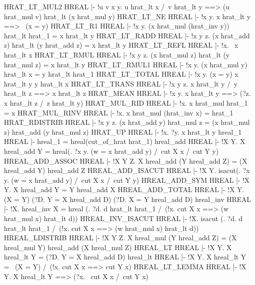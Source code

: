 \ENDTHEOREM
\THEOREM HRAT\_LT\_MUL2 HREAL
|- !u v x y.
    u hrat_lt x /\ v hrat_lt y ==> (u hrat_mul v) hrat_lt (x hrat_mul y)
\ENDTHEOREM
\THEOREM HRAT\_LT\_NE HREAL
|- !x y. x hrat_lt y ==> ~(x = y)
\ENDTHEOREM
\THEOREM HRAT\_LT\_R1 HREAL
|- !x y. (x hrat_mul (hrat_inv y)) hrat_lt hrat_1 = x hrat_lt y
\ENDTHEOREM
\THEOREM HRAT\_LT\_RADD HREAL
|- !x y z. (x hrat_add z) hrat_lt (y hrat_add z) = x hrat_lt y
\ENDTHEOREM
\THEOREM HRAT\_LT\_REFL HREAL
|- !x. ~x hrat_lt x
\ENDTHEOREM
\THEOREM HRAT\_LT\_RMUL HREAL
|- !x y z. (x hrat_mul z) hrat_lt (y hrat_mul z) = x hrat_lt y
\ENDTHEOREM
\THEOREM HRAT\_LT\_RMUL1 HREAL
|- !x y. (x hrat_mul y) hrat_lt x = y hrat_lt hrat_1
\ENDTHEOREM
\THEOREM HRAT\_LT\_TOTAL HREAL
|- !x y. (x = y) \/ x hrat_lt y \/ y hrat_lt x
\ENDTHEOREM
\THEOREM HRAT\_LT\_TRANS HREAL
|- !x y z. x hrat_lt y /\ y hrat_lt z ==> x hrat_lt z
\ENDTHEOREM
\THEOREM HRAT\_MEAN HREAL
|- !x y. x hrat_lt y ==> (?z. x hrat_lt z /\ z hrat_lt y)
\ENDTHEOREM
\THEOREM HRAT\_MUL\_RID HREAL
|- !x. x hrat_mul hrat_1 = x
\ENDTHEOREM
\THEOREM HRAT\_MUL\_RINV HREAL
|- !x. x hrat_mul (hrat_inv x) = hrat_1
\ENDTHEOREM
\THEOREM HRAT\_RDISTRIB HREAL
|- !x y z.
    (x hrat_add y) hrat_mul z = (x hrat_mul z) hrat_add (y hrat_mul z)
\ENDTHEOREM
\THEOREM HRAT\_UP HREAL
|- !x. ?y. x hrat_lt y
\ENDTHEOREM
\THEOREM hreal\_1 HREAL
|- hreal_1 = hreal(cut_of_hrat hrat_1)
\ENDTHEOREM
\THEOREM hreal\_add HREAL
|- !X Y.
    X hreal_add Y =
    hreal(\w. ?x y. (w = x hrat_add y) /\ cut X x /\ cut Y y)
\ENDTHEOREM
\THEOREM HREAL\_ADD\_ASSOC HREAL
|- !X Y Z. X hreal_add (Y hreal_add Z) = (X hreal_add Y) hreal_add Z
\ENDTHEOREM
\THEOREM HREAL\_ADD\_ISACUT HREAL
|- !X Y. isacut(\w. ?x y. (w = x hrat_add y) /\ cut X x /\ cut Y y)
\ENDTHEOREM
\THEOREM HREAL\_ADD\_SYM HREAL
|- !X Y. X hreal_add Y = Y hreal_add X
\ENDTHEOREM
\THEOREM HREAL\_ADD\_TOTAL HREAL
|- !X Y. (X = Y) \/ (?D. Y = X hreal_add D) \/ (?D. X = Y hreal_add D)
\ENDTHEOREM
\THEOREM hreal\_inv HREAL
|- !X.
    hreal_inv X =
    hreal
    (\w.
      ?d. d hrat_lt hrat_1 /\ (!x. cut X x ==> (w hrat_mul x) hrat_lt d))
\ENDTHEOREM
\THEOREM HREAL\_INV\_ISACUT HREAL
|- !X.
    isacut
    (\w.
      ?d. d hrat_lt hrat_1 /\ (!x. cut X x ==> (w hrat_mul x) hrat_lt d))
\ENDTHEOREM
\THEOREM HREAL\_LDISTRIB HREAL
|- !X Y Z.
    X hreal_mul (Y hreal_add Z) =
    (X hreal_mul Y) hreal_add (X hreal_mul Z)
\ENDTHEOREM
\THEOREM HREAL\_LT HREAL
|- !X Y. X hreal_lt Y = (?D. Y = X hreal_add D)
\ENDTHEOREM
\THEOREM hreal\_lt HREAL
|- !X Y. X hreal_lt Y = ~(X = Y) /\ (!x. cut X x ==> cut Y x)
\ENDTHEOREM
\THEOREM HREAL\_LT\_LEMMA HREAL
|- !X Y. X hreal_lt Y ==> (?x. ~cut X x /\ cut Y x)
